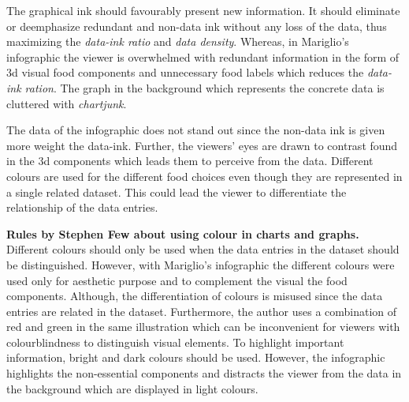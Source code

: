 The graphical ink should favourably present new information. It should eliminate
or deemphasize redundant and non-data ink without any loss of the data, thus
maximizing the \textit{data-ink ratio} and \textit{data density}. Whereas, in
Mariglio's infographic the viewer is overwhelmed with redundant information in
the form of 3d visual food components and unnecessary food labels which reduces
the \textit{data-ink ration}. The graph in the background which represents the
concrete data is cluttered with \textit{chartjunk}.

The data of the infographic does not stand out since the non-data ink is given
more weight the data-ink. Further, the viewers' eyes are drawn to contrast found
in the 3d components which leads them to perceive from the data. Different
colours are used for the different food choices even though they are represented
in a single related dataset. This could lead the viewer to differentiate the
relationship of the data entries.

\textbf{Rules by Stephen Few about using colour in charts and
graphs.}~\cite{Stephen2004} Different colours should only be used when the data
entries in the dataset should be distinguished. However, with Mariglio's
infographic the different colours were used only for aesthetic purpose and to
complement the visual the food components. Although, the differentiation of
colours is misused since the data entries are related in the dataset.
Furthermore, the author uses a combination of red and green in the same
illustration which can be inconvenient for viewers with colourblindness to
distinguish visual elements. To highlight important information, bright and dark
colours should be used. However, the infographic highlights the non-essential
components and distracts the viewer from the data in the background which are
displayed in light colours.
